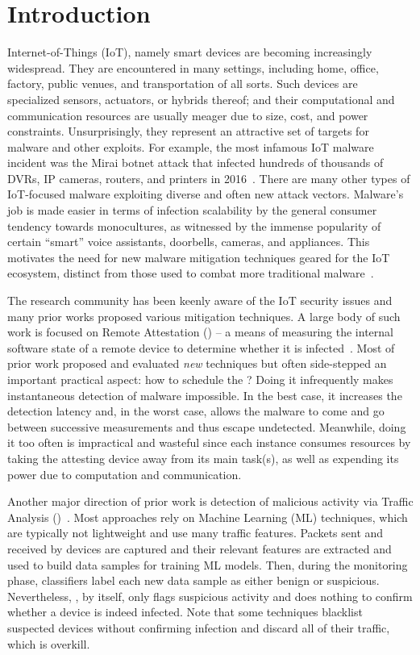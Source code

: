 \section{Introduction}
%
Internet-of-Things (IoT), namely smart devices are becoming increasingly widespread. They are encountered in many settings,
including home, office, factory, public venues, and transportation of all sorts. Such devices are specialized sensors,
actuators, or hybrids thereof; and their computational and communication resources are usually meager due to size, cost,
and power constraints. Unsurprisingly, they represent an attractive set of targets for malware and other exploits.
For example, the most infamous IoT malware incident was the Mirai botnet attack that infected hundreds of thousands of 
DVRs, IP cameras, routers, and printers in 2016~\cite{antonakakis2017understanding}. There are many other types
of IoT-focused malware exploiting diverse and often new attack vectors. Malware's job is made easier in terms
of infection scalability by the general consumer tendency towards monocultures, as witnessed by the immense popularity 
of certain ``smart'' voice assistants, doorbells, cameras, and appliances. This motivates the need for new malware mitigation
techniques geared for the IoT ecosystem, distinct from those used to combat more traditional malware~\cite{alrawi2021circle}. 

The research community has been keenly aware of the IoT security issues and many prior works proposed various mitigation
techniques. A large body of such work is focused on Remote Attestation (\ra{}) -- a means of measuring the internal 
software state of a remote device to determine whether it is infected~\cite{sancus,grisafi2022pistis,ammar2020simple,vrasedp}. 
Most of prior work proposed and evaluated \textit{new} \ra{} techniques but often side-stepped an important practical
aspect: how to schedule the \ra? Doing it infrequently makes instantaneous detection of malware impossible. In the best case, it increases the detection latency and, in the worst case, allows the malware to come and go between successive measurements and thus escape undetected. Meanwhile, doing it too often is impractical and wasteful since each \ra instance consumes resources by 
taking the attesting device away from its main task(s), as well as expending its power due to computation and communication.

Another major direction of prior work is detection of malicious activity via Traffic Analysis (\ta)~\cite{tekiner2022lightweight,marin2019deep,meidan2018n,alrashdi2019ad,wozniak2020recurrent}.
Most \ta{} approaches rely on Machine Learning (ML) techniques, which are typically not lightweight 
and use many traffic features. 
Packets sent and received by \iot{} devices are captured and their relevant features are extracted and used to build data samples for training ML models. Then, during the monitoring phase, classifiers label each new data 
sample as either benign or suspicious. 
Nevertheless, \ta, by itself, only flags suspicious
activity and does nothing to confirm whether a device is indeed infected. Note that some \ta techniques blacklist
suspected devices without confirming infection and discard all of their traffic, which is overkill.

